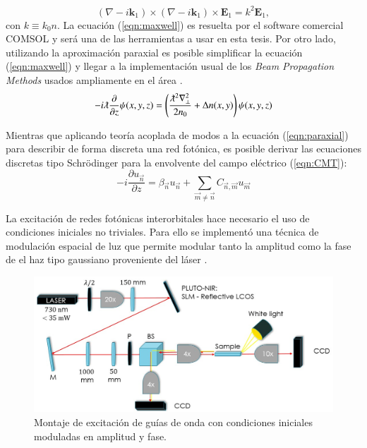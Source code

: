 \documentclass{article}
\begin{document}
\begin{equation}
	(\nabla-i\textbf{k}_1)\times(\nabla-i\textbf{k}_1)\times \textbf{E}_1 = k^2 \textbf{E}_1,
	 \label{eqn:maxwell}
\end{equation}
con $k \equiv k_0 n$.
La ecuación (\ref{eqn:maxwell}) es resuelta por el software comercial COMSOL y será una de las herramientas a usar en esta tesis. Por otro lado, utilizando la aproximación paraxial es posible simplificar la ecuación (\ref{eqn:maxwell}) y llegar a la implementación usual de los \textit{Beam Propagation Methods} usados ampliamente en el área \cite{bpm}.
\begin{equation}
	-i\lambdabar\frac{\partial}{\partial z}\psi(x,y,z) = \left(\frac{\lambdabar^2\nabla_\perp^2}{2n_0} + \Delta n(x,y)\right) \psi (x,y,z) \label{eqn:paraxial}
\end{equation}

Mientras que aplicando teoría acoplada de modos a la ecuación (\ref{eqn:paraxial}) para describir de forma discreta una red fotónica, es posible derivar las ecuaciones discretas tipo Schrödinger para la envolvente del campo eléctrico (\ref{eqn:CMT}):
\begin{equation}
	-i\frac{\partial u_{\vec{n}} }{\partial z} = \beta_{\vec{n}}u_{\vec{n}} + \sum_{\vec{m}\neq\vec{n}} C_{\vec{n},\vec{m}}u_{\vec{m}} \label{eqn:CMT}
\end{equation}

La excitación de redes fotónicas interorbitales hace necesario el uso de condiciones iniciales no triviales. Para ello se implementó una técnica de modulación espacial de luz que permite modular tanto la amplitud como la fase de el haz tipo gaussiano proveniente del láser \cite{slm}.

\begin{figure}[H]
	\centering
	\includegraphics[width=0.9\linewidth]{./media/SLMsetup.png}
	\caption{Montaje de excitación de guías de onda con condiciones iniciales moduladas en amplitud y fase.\label{fig:SLM}}
\end{figure}
\end{document}
